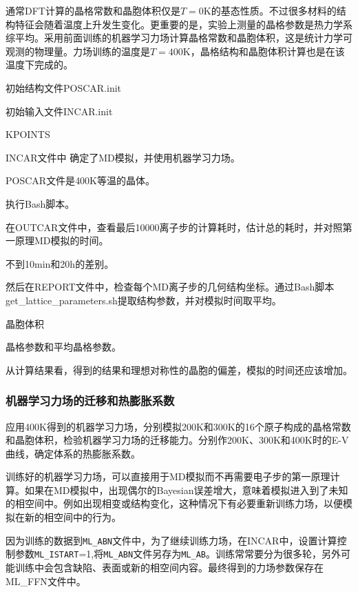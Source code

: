 通常\textrm{DFT}计算的晶格常数和晶胞体积仅是$T=0\mathrm{K}$的基态性质。不过很多材料的结构特征会随着温度上升发生变化。更重要的是，实验上测量的晶格参数是热力学系综平均。采用前面训练的机器学习力场计算晶格常数和晶胞体积，这是统计力学可观测的物理量。力场训练的温度是$T=400\mathrm{K}$，晶格结构和晶胞体积计算也是在该温度下完成的。

初始结构文件\textrm{POSCAR.init}

初始输入文件\textrm{INCAR.init}

\textrm{KPOINTS}

\textrm{INCAR}文件中%
确定了\textrm{MD}模拟，并使用机器学习力场。

\textrm{POSCAR}文件是\textrm{400K}等温的晶体。

执行\textrm{Bash}脚本。

在\textrm{OUTCAR}文件中，查看最后10000离子步的计算耗时，估计总的耗时，并对照第一原理\textrm{MD}模拟的时间。

不到\textrm{10min}和\textrm{20h}的差别。

然后在\textrm{REPORT}文件中，检查每个\textrm{MD}离子步的几何结构坐标。通过\textrm{Bash}脚本\textrm{get\_lattice\_parameters.sh}提取结构参数，并对模拟时间取平均。

晶胞体积

晶格参数和平均晶格参数。

从计算结果看，得到的结果和理想对称性的晶胞的偏差，模拟的时间还应该增加。

\subsubsection{机器学习力场的迁移和热膨胀系数}
应用\textrm{400K}得到的机器学习力场，分别模拟\textrm{200K}和\textrm{300K}的16个原子构成的晶格常数和晶胞体积，检验机器学习力场的迁移能力。分别作\textrm{200K}、\textrm{300K}和\textrm{400K}时的\textrm{E-V}曲线，确定体系的热膨胀系数。

训练好的机器学习力场，可以直接用于\textrm{MD}模拟而不再需要电子步的第一原理计算。如果在\textrm{MD}模拟中，出现偶尔的\textrm{Bayesian}误差增大，意味着模拟进入到了未知的相空间中。例如出现相变或结构变化，这种情况下有必要重新训练力场，以便模拟在新的相空间中的行为。

因为训练的数据到\texttt{ML\_ABN}文件中，为了继续训练力场，在\textrm{INCAR}中，设置计算控制参数\texttt{ML\_ISTART}=1,将\texttt{ML\_ABN}文件另存为\texttt{ML\_AB}。训练常常要分为很多轮，另外可能训练中会包含缺陷、表面或新的相空间内容。最终得到的力场参数保存在\textrm{ML\_FFN}文件中。

